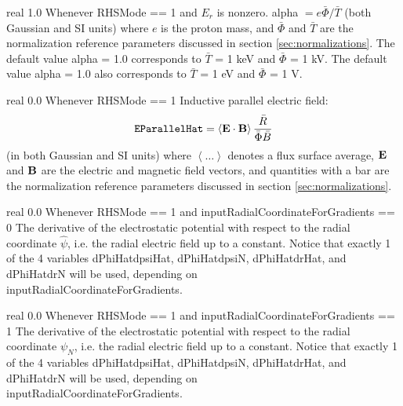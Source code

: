\myhrule

{real}
{1.0}
{Whenever {\ttfamily RHSMode} == 1 and $E_r$ is nonzero.}
{{\ttfamily alpha} $= e \bar{\Phi}/ \bar{T}$ (both Gaussian and SI units) where $e$ is the proton mass,
and $\bar{\Phi}$ and $\bar{T}$ are the normalization reference parameters discussed in section \ref{sec:normalizations}.
The default value {\ttfamily alpha} = 1.0 corresponds to $\bar{T}$ = 1 keV and $\bar{\Phi}$ = 1 kV.
The default value {\ttfamily alpha} = 1.0 also corresponds to $\bar{T}$ = 1 eV and $\bar{\Phi}$ = 1 V.
}

\myhrule

{real}
{0.0}
{Whenever {\ttfamily RHSMode} == 1}
{Inductive parallel electric field:
\begin{equation}
\mbox{\ttfamily EParallelHat} = \left< {\mathbf E}\cdot{\mathbf B}\right> \frac{\bar{R}}{\bar{\Phi}\bar{B}}
\end{equation}
(in both Gaussian and SI units) where $\left< \ldots \right>$ denotes a flux surface average,
${\mathbf E}$ and ${\mathbf B}$ are the electric and magnetic field vectors, and 
quantities with a bar are the normalization reference parameters discussed in section \ref{sec:normalizations}.}

\myhrule

{real}
{0.0}
{Whenever {\ttfamily RHSMode} == 1 and {\ttfamily inputRadialCoordinateForGradients} == 0}
{The derivative of the electrostatic potential with respect to the radial coordinate $\hat{\psi}$,
i.e. the radial electric field up to a constant.
Notice that exactly 1 of the 4 variables {\ttfamily dPhiHatdpsiHat}, {\ttfamily dPhiHatdpsiN}, {\ttfamily dPhiHatdrHat}, and {\ttfamily dPhiHatdrN}
will be used, depending on\\
{\ttfamily inputRadialCoordinateForGradients}.
}

\myhrule

{real}
{0.0}
{Whenever {\ttfamily RHSMode} == 1 and {\ttfamily inputRadialCoordinateForGradients} == 1}
{The derivative of the electrostatic potential with respect to the radial coordinate $\psi_N$,
i.e. the radial electric field up to a constant.
Notice that exactly 1 of the 4 variables {\ttfamily dPhiHatdpsiHat}, {\ttfamily dPhiHatdpsiN}, {\ttfamily dPhiHatdrHat}, and {\ttfamily dPhiHatdrN}
will be used, depending on\\
{\ttfamily inputRadialCoordinateForGradients}.
}

\myhrule

